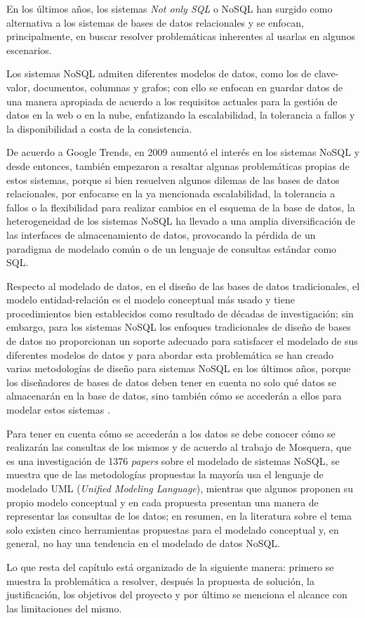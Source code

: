 En los últimos años, los sistemas \textit{Not only SQL} o NoSQL han surgido como alternativa a los sistemas de bases de datos relacionales y se enfocan, principalmente, en buscar resolver problemáticas inherentes al usarlas en algunos escenarios.


Los sistemas NoSQL admiten diferentes modelos de datos, como los de clave-valor, documentos, columnas y grafos; con ello se enfocan en guardar datos de una manera apropiada de acuerdo a los requisitos actuales para la gestión de datos en la web o en la nube, enfatizando la escalabilidad, la tolerancia a fallos y la disponibilidad a costa de la consistencia.



De acuerdo a Google Trends\cite{google_google_2020}, en 2009 aumentó el interés en los sistemas NoSQL y desde entonces, también empezaron a resaltar algunas problemáticas propias de estos sistemas, porque si bien resuelven algunos dilemas de las bases de datos relacionales, por enfocarse en la ya mencionada escalabilidad, la tolerancia a fallos o la flexibilidad para realizar cambios en el esquema de la base de datos, la heterogeneidad de los sistemas NoSQL ha llevado a una amplia diversificación de las interfaces de almacenamiento de datos, provocando la pérdida de un paradigma de modelado común o de un lenguaje de consultas estándar como SQL.


Respecto al modelado de datos, en el diseño de las bases de datos tradicionales, el modelo entidad-relación\cite{codd_relational_nodate} es el modelo conceptual más usado y tiene procedimientos bien establecidos como resultado de décadas de investigación; sin embargo, para los sistemas NoSQL los enfoques tradicionales de diseño de bases de datos no proporcionan un soporte adecuado para satisfacer el modelado de sus diferentes modelos de datos y para abordar esta problemática se han creado varias metodologías de diseño para sistemas NoSQL en los últimos años, porque los diseñadores de bases de datos deben tener en cuenta no solo qué datos se almacenarán en la base de datos, sino también cómo se accederán a ellos para modelar estos sistemas \cite{li_transforming_2010,chebotko_big_2015,mior_nose_2017}. 


Para tener en cuenta cómo se accederán a los datos se debe conocer cómo se realizarán las consultas de los mismos y de acuerdo al trabajo de Mosquera\cite{martinez-mosquera_modeling_2020}, que es una investigación de 1376 \textit{papers} sobre el modelado de sistemas NoSQL, se muestra que de las metodologías propuestas la mayoría usa el lenguaje de modelado UML (\textit{Unified Modeling Language}), mientras que algunos proponen su propio modelo conceptual  y en cada propuesta presentan una manera de representar las consultas de los datos; en resumen, en la literatura sobre el tema solo existen cinco herramientas propuestas para el modelado conceptual y, en general, no hay una tendencia en el modelado de datos NoSQL.


Lo que resta del capítulo está organizado de la siguiente manera: primero se muestra la problemática a resolver, después la propuesta de solución, la justificación, los objetivos del proyecto y por último se menciona el alcance con las limitaciones del mismo.